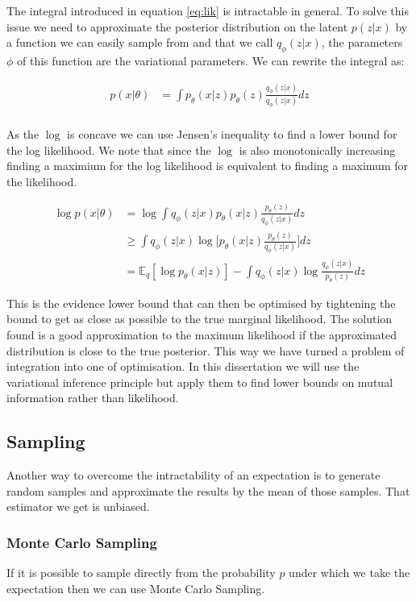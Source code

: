 \documentclass[11pt,oneside,openright]{report}
\begin{document}
The integral introduced in equation \ref{eq:lik} is intractable in general. To solve this issue we need to approximate the posterior distribution on the latent $p(z|x)$ by a function we can easily sample from and that we call $q_\phi(z|x)$, the parameters $\phi$ of this function are the variational parameters. We can rewrite the integral as:

\begin{align}
p(x|\theta) &= \int p_\theta(x|z) p_\theta(z) \frac{q_\phi(z|x)}{q_\phi(z|x)}dz \\
\end{align}

As the $\log$ is concave we can use Jensen's inequality to find a lower bound for the log likelihood. We note that since the $\log$ is also monotonically increasing finding a maximium for the log likelihood is equivalent to finding a maximum for the likelihood.

\begin{align}
\log p(x|\theta) &= \log \int q_\phi(z|x) p_\theta(x|z) \frac{p_\theta(z)}{q_\phi(z|x)}dz\\
	&\geq  \int q_\phi(z|x) \log \Big[  p_\theta(x|z) \frac{p_\theta(z)}{q_\phi(z|x)} \Big]dz\\
	&=  \mathbb{E}_q[\log  p_\theta(x|z)] - \int q_\phi(z|x) \log   \frac{q_\phi(z|x)}{p_\theta(z)}dz
\label{eq:elbo}
\end{align}

This is the evidence lower bound that can then be optimised by tightening the bound to get as close as possible
to the true marginal likelihood. The solution found is a good approximation to the maximum likelihood if the approximated distribution is close to the true posterior. This way we have turned a problem of integration into one of optimisation. In this dissertation we will use the variational inference principle but apply them to find lower bounds on mutual information rather than likelihood.

\subsection{Sampling}
Another way to overcome the intractability of an expectation is to generate random samples and approximate the results by the mean of those samples. That estimator we get is unbiased.

\subsubsection{Monte Carlo Sampling}
If it is possible to sample directly from the probability $p$ under which we take the expectation then we can use Monte Carlo Sampling.
\end{document}
